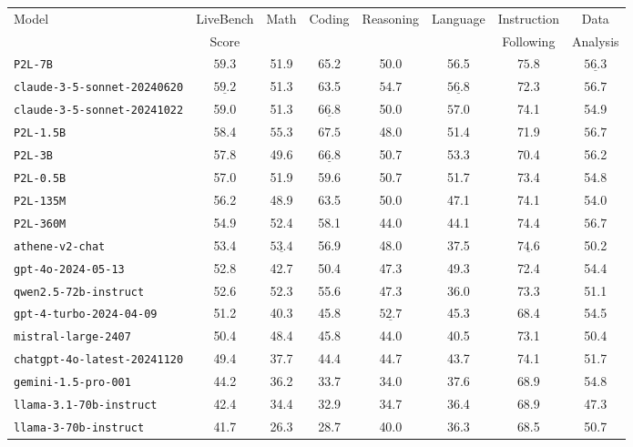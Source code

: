 \begin{table}[H]
\centering
\footnotesize
\begin{tabular}{lccccccc}
\toprule
Model & LiveBench & Math & Coding & Reasoning & Language & Instruction& Data \\
      & Score     &        &  &  &          &    Following  &  Analysis         \\

\midrule
\texttt{P2L-7B} & $\mathbf{59.3}$ & 51.9 & 65.2 & 50.0 & 56.5 & $\mathbf{75.8}$ & $\underline{56.3}$ \\
\texttt{claude-3-5-sonnet-20240620} & $\underline{59.2}$ & 51.3 & 63.5 & $\mathbf{54.7}$ & $\underline{56.8}$ & 72.3 & $\mathbf{56.7}$ \\
\texttt{claude-3-5-sonnet-20241022} & 59.0 & 51.3 & $\underline{66.8}$ & 50.0 & $\mathbf{57.0}$ & 74.1 & 54.9 \\
\texttt{P2L-1.5B} & 58.4 & $\mathbf{55.3}$ & $\mathbf{67.5}$ & 48.0 & 51.4 & 71.9 & $\mathbf{56.7}$ \\
\texttt{P2L-3B} & 57.8 & 49.6 & $\underline{66.8}$ & 50.7 & 53.3 & 70.4 & 56.2 \\
\texttt{P2L-0.5B} & 57.0 & 51.9 & 59.6 & 50.7 & 51.7 & 73.4 & 54.8 \\
\texttt{P2L-135M} & 56.2 & 48.9 & 63.5 & 50.0 & 47.1 & 74.1 & 54.0 \\
\texttt{P2L-360M} & 54.9 & 52.4 & 58.1 & 44.0 & 44.1 & 74.4 & $\mathbf{56.7}$ \\
\texttt{athene-v2-chat} & 53.4 & $\underline{53.4}$ & 56.9 & 48.0 & 37.5 & $\underline{74.6}$ & 50.2 \\
\texttt{gpt-4o-2024-05-13} & 52.8 & 42.7 & 50.4 & 47.3 & 49.3 & 72.4 & 54.4 \\
\texttt{qwen2.5-72b-instruct} & 52.6 & 52.3 & 55.6 & 47.3 & 36.0 & 73.3 & 51.1 \\
\texttt{gpt-4-turbo-2024-04-09} & 51.2 & 40.3 & 45.8 & $\underline{52.7}$ & 45.3 & 68.4 & 54.5 \\
\texttt{mistral-large-2407} & 50.4 & 48.4 & 45.8 & 44.0 & 40.5 & 73.1 & 50.4 \\
\texttt{chatgpt-4o-latest-20241120} & 49.4 & 37.7 & 44.4 & 44.7 & 43.7 & 74.1 & 51.7 \\
\texttt{gemini-1.5-pro-001} & 44.2 & 36.2 & 33.7 & 34.0 & 37.6 & 68.9 & 54.8 \\
\texttt{llama-3.1-70b-instruct} & 42.4 & 34.4 & 32.9 & 34.7 & 36.4 & 68.9 & 47.3 \\
\texttt{llama-3-70b-instruct} & 41.7 & 26.3 & 28.7 & 40.0 & 36.3 & 68.5 & 50.7 \\

\end{tabular}
\end{table}
